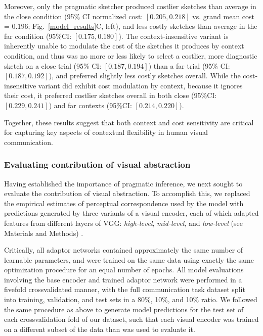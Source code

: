 \documentclass[9pt,twocolumn,twoside]{pnas-new}
\begin{document}
Moreover, only the pragmatic sketcher produced costlier sketches than average in the close condition (95\% CI normalized cost: $[0.205, 0.218]$ vs. grand mean cost = $0.196$; Fig.~\ref{model_results}C, left), and less costly sketches than average in the far condition (95\%CI: $[0.175, 0.180]$). 
The context-insensitive variant is inherently unable to modulate the cost of the sketches it produces by context condition, and thus was no more or less likely to select a costlier, more diagnostic sketch on a close trial (95\% CI: $[0.187, 0.194]$) than a far trial (95\% CI: $[0.187, 0.192]$), and preferred slightly less costly sketches overall. 
While the cost-insensitive variant did exhibit cost modulation by context, because it ignores their cost, it preferred costlier sketches overall in both close (95\%CI: $[0.229, 0.241]$) and far contexts (95\%CI: $[0.214, 0.220]$). 

Together, these results suggest that both context and cost sensitivity are critical for capturing key aspects of contextual flexibility in human visual communication. 

\subsubsection*{Evaluating contribution of visual abstraction}

Having established the importance of pragmatic inference, we next sought to evaluate the contribution of visual abstraction.
To accomplish this, we replaced the empirical estimates of perceptual correspondence used by the model with predictions generated by three variants of a visual encoder, each of which adapted features from different layers of VGG: \textit{high-level}, \textit{mid-level}, and \textit{low-level} (see Materials and Methods) .

Critically, all adaptor networks contained approximately the same number of learnable parameters, and were trained on the same data using exactly the same optimization procedure for an equal number of epochs. 
All model evaluations involving the base encoder and trained adaptor network were performed in a fivefold crossvalidated manner, with the full communication task dataset split into training, validation, and test sets in a 80\%, 10\%, and 10\% ratio. 
We followed the same procedure as above to generate model predictions for the test set of each crossvalidation fold of our dataset, such that each visual encoder was trained on a different subset of the data than was used to evaluate it. 
\end{document}
